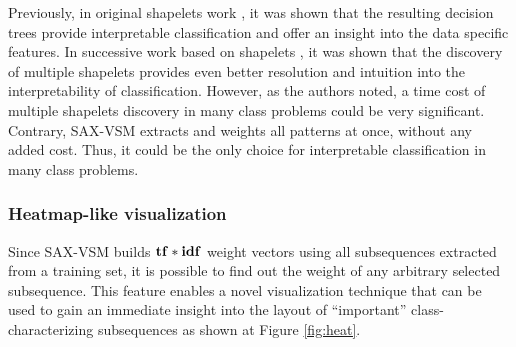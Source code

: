 Previously, in original shapelets work \cite{citeulike:7344347, citeulike:11957982}, it was shown that the 
resulting decision trees provide interpretable classification and offer an insight into the data
specific features. In successive work based on shapelets \cite{citeulike:11345338}, it was shown that
the discovery of multiple shapelets provides even better resolution and intuition into 
the interpretability of classification. 
However, as the authors noted, a time cost of multiple shapelets discovery
in many class problems could be very significant. 
Contrary, SAX-VSM extracts and weights all patterns at once, without any added cost. Thus, it could
be the only choice for interpretable classification in many class problems.

\subsubsection{Heatmap-like visualization}
Since SAX-VSM builds $\text{\textbf{tf}}\ast\text{\textbf{idf}}$ weight vectors using all subsequences extracted from a
training set, it is possible to find out the weight of any arbitrary selected subsequence.
This feature enables a novel visualization technique that can be used to gain an immediate
insight into the layout of ``important'' class-characterizing subsequences as shown at Figure
\ref{fig:heat}.

